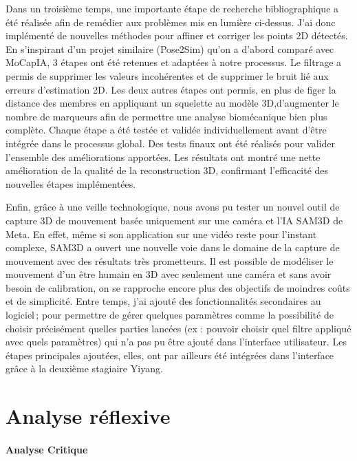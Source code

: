     Dans un troisième temps, une importante étape de recherche bibliographique a été réalisée afin de remédier aux problèmes mis en lumière ci-dessus. J'ai donc implémenté de nouvelles méthodes pour affiner et corriger les points 2D détectés. En s'inspirant d'un projet similaire (Pose2Sim) qu'on a d'abord comparé avec MoCapIA, 3 étapes ont été retenues et adaptées à notre processus. Le filtrage a permis de supprimer les valeurs incohérentes et de supprimer le bruit lié aux erreurs d'estimation 2D. Les deux autres étapes ont permis, en plus de figer la distance des membres en appliquant un squelette au modèle 3D,d'augmenter le nombre de marqueurs afin de permettre une analyse biomécanique bien plus complète. Chaque étape a été testée et validée individuellement avant d'être intégrée dans le processus global. Des tests finaux ont été réalisés pour valider l'ensemble des améliorations apportées. Les résultats ont montré une nette amélioration de la qualité de la reconstruction 3D, confirmant l'efficacité des nouvelles étapes implémentées. 
    
    Enfin, grâce à une veille technologique, nous avons pu tester un nouvel outil de capture 3D de mouvement basée uniquement sur une caméra et l'IA SAM3D de Meta. En effet, même si son application sur une vidéo reste pour l'instant complexe, SAM3D a ouvert une nouvelle voie dans le domaine de la capture de mouvement avec des résultats très prometteurs. Il est possible de modéliser le mouvement d'un être humain en 3D avec seulement une caméra et sans avoir besoin de calibration, on se rapproche encore plus des objectifs de moindres coûts et de simplicité. Entre temps, j'ai ajouté des fonctionnalités secondaires au logiciel ; pour permettre de gérer quelques paramètres comme la possibilité de choisir précisément quelles parties lancées (ex : pouvoir choisir quel filtre appliqué avec quels paramètres) qui n'a pas pu être ajouté dans l'interface utilisateur. Les étapes principales ajoutées, elles, ont par ailleurs été intégrées dans l'interface grâce à la deuxième stagiaire Yiyang.

\section{Analyse réflexive}
    
    \paragraph{Analyse Critique}


